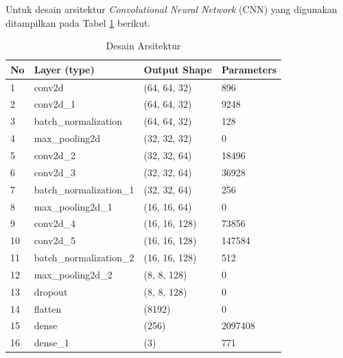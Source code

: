     Untuk desain arsitektur \textit{Convolutional Neural Network} (CNN) yang digunakan ditampilkan pada Tabel 
    \ref{Desain arsitektur} berikut.

    

    \begin{table}[H]
        \centering
        \scriptsize
        \caption{Desain Arsitektur}
        \label{Desain arsitektur}
        \renewcommand{\arraystretch}{1.5}
        \begin{tabular}{p{1cm}p{4.5cm}p{4cm}p{2.5cm}}
        \hline
        \textbf{No} & \textbf{Layer (type)}   & \textbf{Output Shape} & \textbf{Parameters}  \\ \hline
        
        1 & conv2d                   & (64, 64, 32)   & 896     \\ 
        2 & conv2d\_1                & (64, 64, 32)   & 9248    \\ 
        3 & batch\_normalization     & (64, 64, 32)   & 128     \\ 
        4 & max\_pooling2d           & (32, 32, 32)   & 0       \\ 
        5 & conv2d\_2                & (32, 32, 64)   & 18496   \\ 
        6 & conv2d\_3                & (32, 32, 64)   & 36928   \\ 
        7 & batch\_normalization\_1  & (32, 32, 64)   & 256     \\ 
        8 & max\_pooling2d\_1        & (16, 16, 64)   & 0       \\ 
        9 & conv2d\_4                & (16, 16, 128)  & 73856   \\ 
        10 & conv2d\_5                & (16, 16, 128)  & 147584  \\ 
        11 & batch\_normalization\_2  & (16, 16, 128)  & 512     \\ 
        12 & max\_pooling2d\_2        & (8, 8, 128)    & 0       \\ 
        13 & dropout                  & (8, 8, 128)    & 0       \\ 
        14 & flatten                  & (8192)         & 0       \\ 
        15 & dense                    & (256)          & 2097408 \\ 
        16 & dense\_1                 & (3)            & 771     \\ \hline
        \end{tabular}
    \end{table}






